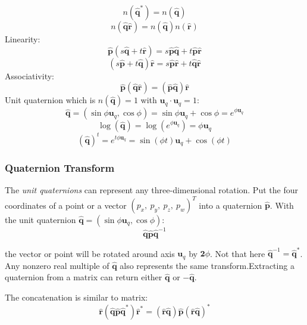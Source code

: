 \documentclass[10pt, a4paper]{article}
\begin{document}
                $$n(\hat{\textbf{q}}^*) = n(\hat{\textbf{q}})$$
                $$n(\hat{\textbf{q}}\hat{\textbf{r}}) = n(\hat{\textbf{q}})n(\hat{\textbf{r}})$$
            \indent Linearity: 
                $$\hat{\textbf{p}}(s\hat{\textbf{q}} + t\hat{\textbf{r}}) = s\hat{\textbf{p}}\hat{\textbf{q}} + t\hat{\textbf{p}}\hat{\textbf{r}}$$
                $$(s\hat{\textbf{p}} + t\hat{\textbf{q}})\hat{\textbf{r}} = s\hat{\textbf{p}}\hat{\textbf{r}} + t\hat{\textbf{q}}\hat{\textbf{r}}$$
            \indent Associativity:
                $$\hat{\textbf{p}}(\hat{\textbf{q}}\hat{\textbf{r}}) = (\hat{\textbf{p}}\hat{\textbf{q}})\hat{\textbf{r}}$$
            \indent Unit quaternion which is $n(\hat{\textbf{q}}) = 1$ with $\textbf{u}_q\cdot\textbf{u}_q = 1$: 
                $$\hat{\textbf{q}} = (\sin{\phi}\textbf{u}_q, \cos{\phi}) = \sin{\phi}\textbf{u}_q + \cos{\phi} = e^{\phi\textbf{u}_q}$$
                $$\log{(\hat{\textbf{q}})} = \log{(e^{\phi\textbf{u}_q})} = \phi\textbf{u}_q$$
                $$(\hat{\textbf{q}})^t = e^{t\phi\textbf{u}_q} = \sin{(\phi t)}\textbf{u}_q + \cos{(\phi t)}$$
        
            \subsubsection{Quaternion Transform}
                The \emph{unit quaternions} can represent any three-dimensional rotation. Put the four coordinates of a point or a vector $(p_x,\ p_y,\ p_z,\ p_w)^T$ into a quaternion $\hat{\textbf{p}}$. With the unit quaternion $\hat{\textbf{q}} = (\sin{\phi}\textbf{u}_q, \cos{\phi})$:
                $$\hat{\textbf{q}}\hat{\textbf{p}}\hat{\textbf{q}}^{-1}$$
                
                the vector or point will be rotated around axis $\textbf{u}_q$ by $\textbf{2$\phi$}$. Not that here $\hat{\textbf{q}}^{-1} = \hat{\textbf{q}}^{*}$. Any nonzero real multiple of $\hat{\textbf{q}}$ also represents the same transform.Extracting a quaternion from a matrix can return either $\hat{\textbf{q}}$ or $-\hat{\textbf{q}}$.

                The concatenation is similar to matrix: 
                $$\hat{\textbf{r}}(\hat{\textbf{q}}\hat{\textbf{p}}\hat{\textbf{q}}^{*})\hat{\textbf{r}}^{*} = (\hat{\textbf{r}}\hat{\textbf{q}})\hat{\textbf{p}}(\hat{\textbf{r}}\hat{\textbf{q}})^{*}$$
                
\end{document}
